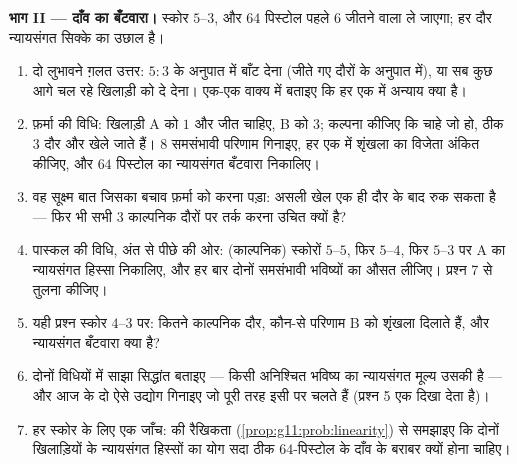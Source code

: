 \begin{problem}[{सप्ताहांत समस्या --- पास्कल, फ़र्मा और बीच में रुके दाँव का
न्यायसंगत बँटवारा: प्रत्याशा का जन्म, रैखिकता का जादू, और वह जो प्रत्याशा
नहीं देख पाती}]
\medskip
\noindent\textbf{भाग II --- दाँव का बँटवारा।}
स्कोर $5$--$3$, और $64$ पिस्टोल पहले $6$ जीतने वाला ले जाएगा; हर दौर
न्यायसंगत सिक्के का उछाल है।
\begin{enumerate}[resume]
  \item दो लुभावने ग़लत उत्तर: $5 : 3$ के अनुपात में बाँट देना (जीते गए दौरों
        के अनुपात में), या सब कुछ आगे चल रहे खिलाड़ी को दे देना। एक-एक वाक्य
        में बताइए कि हर एक में अन्याय क्या है।
  \item फ़र्मा की विधि: खिलाड़ी A को $1$ और जीत चाहिए, B को $3$; कल्पना
        कीजिए कि चाहे जो हो, ठीक $3$ दौर और खेले जाते हैं। $8$ समसंभावी
        परिणाम गिनाइए, हर एक में शृंखला का विजेता अंकित कीजिए, और $64$
        पिस्टोल का न्यायसंगत बँटवारा निकालिए।
  \item वह सूक्ष्म बात जिसका बचाव फ़र्मा को करना पड़ा: असली खेल एक ही दौर के
        बाद रुक सकता है --- फिर भी सभी $3$ काल्पनिक दौरों पर तर्क करना
        उचित क्यों है?
  \item पास्कल की विधि, अंत से पीछे की ओर: (काल्पनिक) स्कोरों $5$--$5$,
        फिर $5$--$4$, फिर $5$--$3$ पर A का न्यायसंगत हिस्सा
        निकालिए, और हर बार दोनों समसंभावी भविष्यों का औसत लीजिए। प्रश्न 7
        से तुलना कीजिए।
  \item यही प्रश्न स्कोर $4$--$3$ पर: कितने काल्पनिक दौर, कौन-से परिणाम
        B को शृंखला दिलाते हैं, और न्यायसंगत बँटवारा क्या है?
  \item दोनों विधियों में साझा सिद्धांत बताइए --- किसी अनिश्चित भविष्य का
        न्यायसंगत मूल्य उसकी \emph{} है --- और आज के दो ऐसे उद्योग
        गिनाइए जो पूरी तरह इसी पर चलते हैं (प्रश्न 5 एक दिखा देता है)।
  \item हर स्कोर के लिए एक जाँच:  की रैखिकता (\cref{prop:g11:prob:linearity}) से समझाइए कि
        दोनों खिलाड़ियों के न्यायसंगत हिस्सों का योग सदा ठीक $64$-पिस्टोल
        के दाँव के बराबर क्यों होना चाहिए।
\end{enumerate}


\end{problem}
